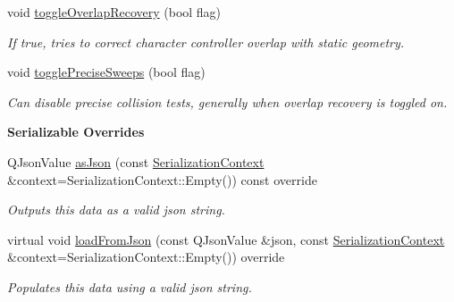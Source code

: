 \begin{Indent}
\begin{DoxyCompactItemize}
\mbox{\label{classrev_1_1_c_c_t_manager_acf44c6e660fbcc62ee57c168600b00c9}} 
void \mbox{\hyperlink{classrev_1_1_c_c_t_manager_acf44c6e660fbcc62ee57c168600b00c9}{toggle\+Overlap\+Recovery}} (bool flag)
\begin{DoxyCompactList}\small\item\em If true, tries to correct character controller overlap with static geometry. \end{DoxyCompactList}\item 
\mbox{\label{classrev_1_1_c_c_t_manager_acf34fb3460e945b8956c024469c88bb6}} 
void \mbox{\hyperlink{classrev_1_1_c_c_t_manager_acf34fb3460e945b8956c024469c88bb6}{toggle\+Precise\+Sweeps}} (bool flag)
\begin{DoxyCompactList}\small\item\em Can disable precise collision tests, generally when overlap recovery is toggled on. \end{DoxyCompactList}\end{DoxyCompactItemize}
\end{Indent}
\begin{Indent}\textbf{ Serializable Overrides}\par
\begin{DoxyCompactItemize}
\item 
\mbox{\label{classrev_1_1_c_c_t_manager_aee2b28ec3132bf37fa4325239267fd79}} 
Q\+Json\+Value \mbox{\hyperlink{classrev_1_1_c_c_t_manager_aee2b28ec3132bf37fa4325239267fd79}{as\+Json}} (const \mbox{\hyperlink{structrev_1_1_serialization_context}{Serialization\+Context}} \&context=Serialization\+Context\+::\+Empty()) const override
\begin{DoxyCompactList}\small\item\em Outputs this data as a valid json string. \end{DoxyCompactList}\item 
\mbox{\label{classrev_1_1_c_c_t_manager_a0f58012e22b87718149fb3ace2719f93}} 
virtual void \mbox{\hyperlink{classrev_1_1_c_c_t_manager_a0f58012e22b87718149fb3ace2719f93}{load\+From\+Json}} (const Q\+Json\+Value \&json, const \mbox{\hyperlink{structrev_1_1_serialization_context}{Serialization\+Context}} \&context=Serialization\+Context\+::\+Empty()) override
\begin{DoxyCompactList}\small\item\em Populates this data using a valid json string. \end{DoxyCompactList}\end{DoxyCompactItemize}
\end{Indent}
